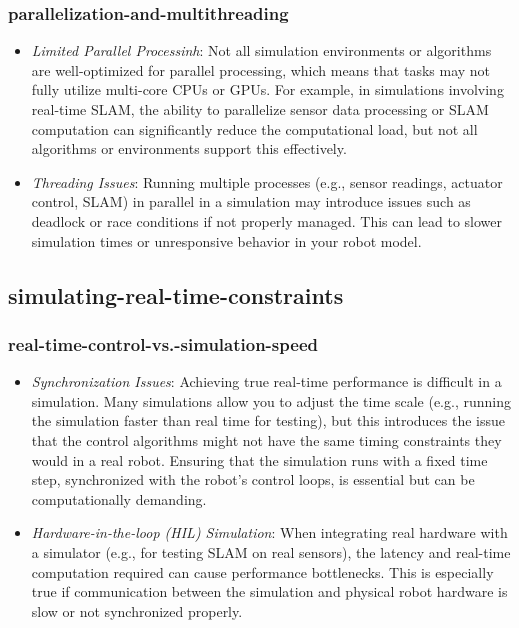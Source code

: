 \documentclass[../../main]{subfiles}
\begin{document}
    \subsubsection{parallelization-and-multithreading}
    \begin{itemize}
    \item
      \emph{Limited Parallel Processinh}: Not all simulation environments
      or algorithms are well-optimized for parallel processing, which means
      that tasks may not fully utilize multi-core CPUs or GPUs. For example,
      in simulations involving real-time SLAM, the ability to parallelize
      sensor data processing or SLAM computation can significantly reduce
      the computational load, but not all algorithms or environments support
      this effectively.
    \item
      \emph{Threading Issues}: Running multiple processes (e.g., sensor
      readings, actuator control, SLAM) in parallel in a simulation may
      introduce issues such as deadlock or race conditions if not properly
      managed. This can lead to slower simulation times or unresponsive
      behavior in your robot model.
    \end{itemize}
    
    \subsection{simulating-real-time-constraints}
    
    \subsubsection{real-time-control-vs.-simulation-speed}
    \begin{itemize}
    \item
      \emph{Synchronization Issues}: Achieving true real-time performance
      is difficult in a simulation. Many simulations allow you to adjust the
      time scale (e.g., running the simulation faster than real time for
      testing), but this introduces the issue that the control algorithms
      might not have the same timing constraints they would in a real robot.
      Ensuring that the simulation runs with a fixed time step, synchronized
      with the robot's control loops, is essential but can be
      computationally demanding.
    \item
      \emph{Hardware-in-the-loop (HIL) Simulation}: When integrating real
      hardware with a simulator (e.g., for testing SLAM on real sensors),
      the latency and real-time computation required can cause performance
      bottlenecks. This is especially true if communication between the
      simulation and physical robot hardware is slow or not synchronized
      properly.
    \end{itemize}
\end{document}
